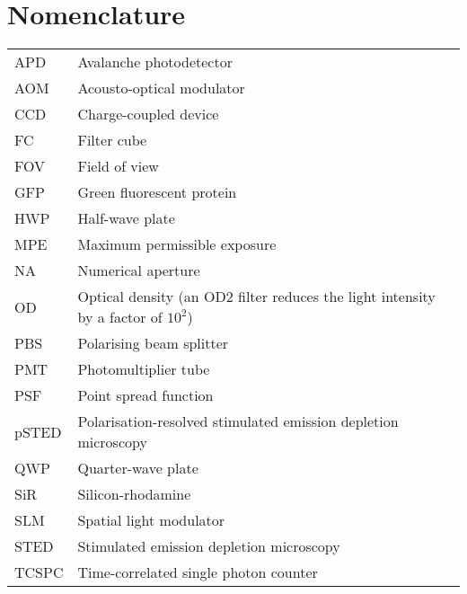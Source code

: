 \chapter{Nomenclature}

\begin{tabular}{ll}
	APD   & Avalanche photodetector                                                              \\
	AOM   & Acousto-optical modulator                                                            \\
	CCD   & Charge-coupled device                                                                \\
	FC    & Filter cube                                                                          \\
	FOV   & Field of view                                                                        \\
	GFP   & Green fluorescent protein                                                            \\
	HWP   & Half-wave plate                                                                      \\
	MPE   & Maximum permissible exposure                                                         \\
	NA    & Numerical aperture                                                                   \\
	OD    & Optical density  (an OD2 filter reduces the light intensity by a factor of $ 10^2 $) \\
	PBS   & Polarising beam splitter                                                             \\
	PMT   & Photomultiplier tube                                                                 \\
	PSF   & Point spread function                                                                \\
	pSTED & Polarisation-resolved stimulated emission depletion microscopy                       \\
	QWP   & Quarter-wave plate                                                                   \\
	SiR   & Silicon-rhodamine                                                                    \\
	SLM   & Spatial light modulator                                                              \\
	STED  & Stimulated emission depletion  microscopy                                            \\
	TCSPC & Time-correlated single photon counter
\end{tabular}